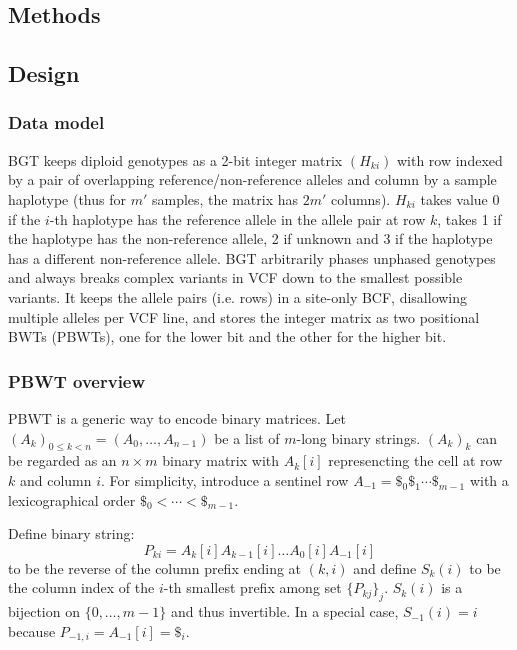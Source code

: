 \documentclass{bioinfo}
\begin{document}
\begin{methods}
\section{Methods}

\subsection{Design}

\subsubsection{Data model}

BGT keeps diploid genotypes as a 2-bit integer matrix $(H_{ki})$ with row
indexed by a pair of overlapping reference/non-reference alleles and column by
a sample haplotype (thus for $m'$ samples, the matrix has $2m'$ columns).
$H_{ki}$ takes value 0 if the $i$-th haplotype has the reference allele in the
allele pair at row $k$, takes 1 if the haplotype has the non-reference allele,
2 if unknown and 3 if the haplotype has a different non-reference allele. BGT
arbitrarily phases unphased genotypes and always breaks complex variants in VCF
down to the smallest possible variants. It keeps the allele pairs (i.e. rows)
in a site-only BCF, disallowing multiple alleles per VCF line, and stores the
integer matrix as two positional BWTs (PBWTs), one for the lower bit and the
other for the higher bit.

\subsubsection{PBWT overview}

PBWT is a generic way to encode binary matrices.
Let $(A_k)_{0\le k<n}=(A_0,\ldots,A_{n-1})$ be a list of $m$-long binary
strings. $(A_k)_k$ can be regarded as an $n\times m$ binary matrix with
$A_k[i]$ represencting the cell at row $k$ and column $i$.  For simplicity,
introduce a sentinel row $A_{-1}=\$_0\$_1\cdots\$_{m-1}$ with a lexicographical
order $\$_0<\cdots<\$_{m-1}$.

Define binary string:
\[
P_{ki}=A_k[i]A_{k-1}[i]\ldots A_0[i]A_{-1}[i]
\]
to be the reverse of the column prefix ending at $(k,i)$ and define $S_k(i)$ to
be the column index of the $i$-th smallest prefix among set $\{P_{kj}\}_j$.
$S_k(i)$ is a bijection on $\{0,\ldots,m-1\}$ and thus invertible. In a
special case, $S_{-1}(i)=i$ because $P_{-1,i}=A_{-1}[i]=\$_i$.


\end{methods}
\end{document}
